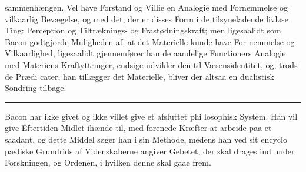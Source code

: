 \documentclass[12pt,a4paper]{book}
\newcommand{\divrule}{\begin{center}\rule{2cm}{0.4pt}\end{center}}
\begin{document}
sammenhængen. Vel have Forstand og Villie en Analogie
med Fornemmelse og vilkaarlig Bevægelse, og med det, der er
disses Form i de tilsyneladende livløse Ting: Perception og
Tiltræknings- og Frastødningskraft; men ligesaalidt som Bacon
godtgjorde Muligheden af, at det Materielle kunde have For\-%
nemmelse og Vilkaarlighed, ligesaalidt gjennemfører han de
aandelige Functioners Analogie med Materiens Kraftyttringer,
endsige udvikler den til Væsensidentitet, og, trods de Prædi\-%
cater, han tillægger det Materielle, bliver der altsaa en dualistisk
Sondring tilbage.

\divrule

Bacon har ikke givet og ikke villet give et afsluttet phi\-%
losophisk System. Han vil give Eftertiden Midlet ihænde til,
med forenede Kræfter at arbeide paa et saadant, og dette
Middel søger han i sin Methode, medens han ved sit encyclo\-%
pædiske Grundrids af Videnskaberne angiver Gebetet, der skal
drages ind under Forskningen, og Ordenen, i hvilken denne
skal gaae frem.
\end{document}
